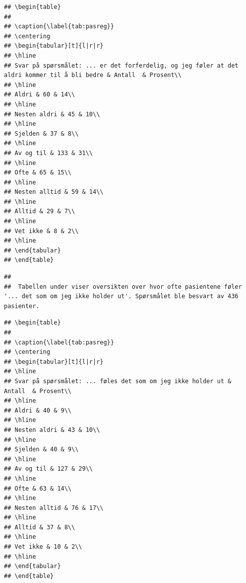 \documentclass[
]{article}
\begin{document}
\begin{verbatim}
## \begin{table}
## 
## \caption{\label{tab:pasreg}}
## \centering
## \begin{tabular}[t]{l|r|r}
## \hline
## Svar på spørsmålet: ... er det forferdelig, og jeg føler at det aldri kommer til å bli bedre & Antall  & Prosent\\
## \hline
## Aldri & 60 & 14\\
## \hline
## Nesten aldri & 45 & 10\\
## \hline
## Sjelden & 37 & 8\\
## \hline
## Av og til & 133 & 31\\
## \hline
## Ofte & 65 & 15\\
## \hline
## Nesten alltid & 59 & 14\\
## \hline
## Alltid & 29 & 7\\
## \hline
## Vet ikke & 8 & 2\\
## \hline
## \end{tabular}
## \end{table}
\end{verbatim}

\begin{verbatim}
## 
##  Tabellen under viser oversikten over hvor ofte pasientene føler '... det som om jeg ikke holder ut'. Spørsmålet ble besvart av 436 pasienter.
\end{verbatim}

\begin{verbatim}
## \begin{table}
## 
## \caption{\label{tab:pasreg}}
## \centering
## \begin{tabular}[t]{l|r|r}
## \hline
## Svar på spørsmålet: ... føles det som om jeg ikke holder ut & Antall  & Prosent\\
## \hline
## Aldri & 40 & 9\\
## \hline
## Nesten aldri & 43 & 10\\
## \hline
## Sjelden & 40 & 9\\
## \hline
## Av og til & 127 & 29\\
## \hline
## Ofte & 63 & 14\\
## \hline
## Nesten alltid & 76 & 17\\
## \hline
## Alltid & 37 & 8\\
## \hline
## Vet ikke & 10 & 2\\
## \hline
## \end{tabular}
## \end{table}
\end{verbatim}
\end{document}
